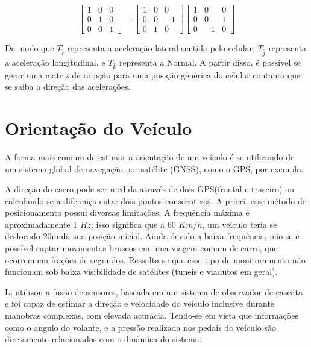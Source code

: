 \begin{equation}
\begin{bmatrix}
1 & 0  & 0 \\ 
0 & 1  & 0 \\ 
0 & 0  & 1
\end{bmatrix} = 
\begin{bmatrix}
1 & 0  & 0 \\ 
0 & 0  & -1 \\ 
0 & 1  & 0
\end{bmatrix}
\begin{bmatrix}
1 & 0  & 0 \\ 
0 & 0  & 1 \\ 
0 & -1  & 0
\end{bmatrix}
\end{equation}{}


De modo que $T_{\hat{i}}$ representa a aceleração lateral sentida pelo celular, $T_{\hat{j}}$ representa a aceleração longitudinal, e $T_{\hat{k}}$ representa a Normal.
A partir disso, é possível se gerar uma matriz de rotação para uma posição genérica do celular contanto que se saiba a direção das acelerações.




\section{Orientação do Veículo}
A forma mais comum de estimar a orientação de um veículo é se utilizando de um sistema global de navegação por satélite (GNSS)\cite{almazan2013full}, como o GPS, por exemplo. 

A direção do carro pode ser medida através de dois GPS(frontal e traseiro) ou calculando-se a diferença entre dois pontos consecutivos. A priori, esse método de posicionamento possui diversas limitações: A frequência máxima é aproximadamente 1 $Hz$; isso significa que a 60 $Km/h$, um veículo teria se deslocado 20m da sua posição inicial. Ainda devido a baixa frequência, não se é possível captar movimentos bruscos em uma viagem comum de carro, que ocorrem em frações de segundos. Ressalta-se \cite{almazan2013full} que esse tipo de monitoramento não funcionam sob baixa visibilidade de satélites (tuneis e viadutos em geral).

Li \cite{li2009vehicle} utilizou a fusão de sensores, baseada em um sistema de observador de cascata e foi capaz de estimar a direção e velocidade do veículo inclusive durante manobras complexas, com elevada acurácia. Tendo-se em vista que informações como o angulo do volante, e a pressão realizada nos pedais do veículo são diretamente relacionados com o dinâmica do sistema. 


